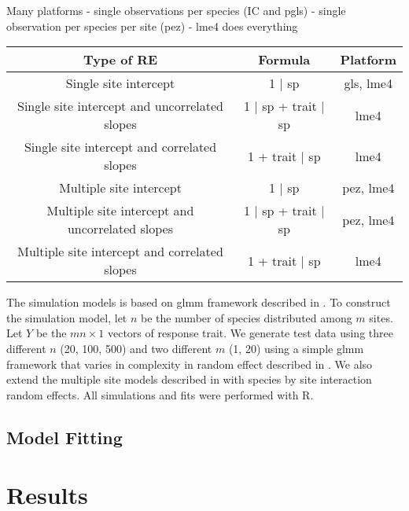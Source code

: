 Many platforms 
- single observations per species (IC and pgls)
- single observation per species per site (pez)
- lme4 does everything


\begin{tabular}{|c|c|c|}
\hline
Type of RE	& Formula	& Platform	\\
\hline

Single site intercept	  &	1 $\mid$ sp	& gls, lme4 \\
Single site intercept and uncorrelated slopes		&  1 $\mid$ sp + trait $\mid$ sp		& lme4 \\
Single site intercept and correlated slopes 			& 1 + trait $\mid$ sp					& lme4 \\
\hline
Multiple site intercept 									&  1 $\mid$ sp 						& pez, lme4 \\
Multiple site intercept and uncorrelated slopes 	&  1 $\mid$ sp + trait $\mid$ sp 		& pez, lme4 \\
Multiple site intercept and correlated slopes 	& 	1 + trait $\mid$ sp					& lme4 \\
\hline
\end{tabular}

The simulation models is based on glmm framework described in .   
To construct the simulation model, let $n$ be the number of species distributed among $m$ sites.
Let $Y$ be the $mn \times 1$ vectors of response trait.  
We generate test data using three different $n$ (20, 100, 500) and two different $m$ (1, 20) using a simple glmm framework that varies in complexity in random effect described in . 
We also extend the multiple site models described in  with species by site interaction random effects. 
All simulations and fits were performed with R. 

\subsection{Model Fitting}



\section{Results}



